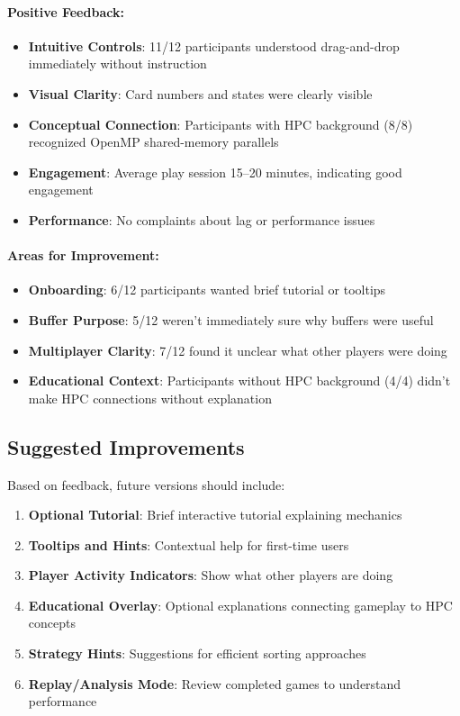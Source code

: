 \paragraph*{Positive Feedback:}

\begin{itemize}
    \item \textbf{Intuitive Controls}: 11/12 participants understood drag-and-drop immediately without instruction
    \item \textbf{Visual Clarity}: Card numbers and states were clearly visible
    \item \textbf{Conceptual Connection}: Participants with HPC background (8/8) recognized OpenMP shared-memory parallels
    \item \textbf{Engagement}: Average play session 15--20 minutes, indicating good engagement
    \item \textbf{Performance}: No complaints about lag or performance issues
\end{itemize}

\paragraph*{Areas for Improvement:}

\begin{itemize}
    \item \textbf{Onboarding}: 6/12 participants wanted brief tutorial or tooltips
    \item \textbf{Buffer Purpose}: 5/12 weren't immediately sure why buffers were useful
    \item \textbf{Multiplayer Clarity}: 7/12 found it unclear what other players were doing
    \item \textbf{Educational Context}: Participants without HPC background (4/4) didn't make HPC connections without explanation
\end{itemize}

\subsection{Suggested Improvements}
\label{subsec:suggested-improvements}

Based on feedback, future versions should include:

\begin{enumerate}
    \item \textbf{Optional Tutorial}: Brief interactive tutorial explaining mechanics
    \item \textbf{Tooltips and Hints}: Contextual help for first-time users
    \item \textbf{Player Activity Indicators}: Show what other players are doing
    \item \textbf{Educational Overlay}: Optional explanations connecting gameplay to HPC concepts
    \item \textbf{Strategy Hints}: Suggestions for efficient sorting approaches
    \item \textbf{Replay/Analysis Mode}: Review completed games to understand performance
\end{enumerate}

